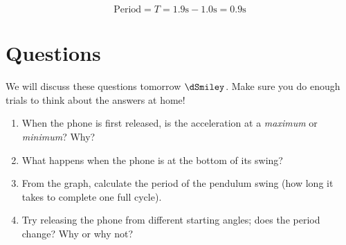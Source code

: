 \documentclass[a4paper]{article}
\begin{document}
\begin{figure}[H]
	\centering
	\qquad
	\label{fig:example}%
\end{figure}

\begin{equation}
	\text{Period} = T = 1.9\text{s} - 1.0\text{s} = 0.9\text{s}
\end{equation}


\section{Questions}

We will discuss these questions tomorrow $\dSmiley$. Make sure you do enough trials to think about the answers at home!

\begin{enumerate}
    \item When the phone is first released, is the acceleration at a \textit{maximum} or \textit{minimum}? Why?
    \item What happens when the phone is at the bottom of its swing?
    \item From the graph, calculate the period of the pendulum swing (how long it takes to complete one full cycle).
    \item Try releasing the phone from different starting angles; does the period change? Why or why not?
\end{enumerate}
\end{document}
